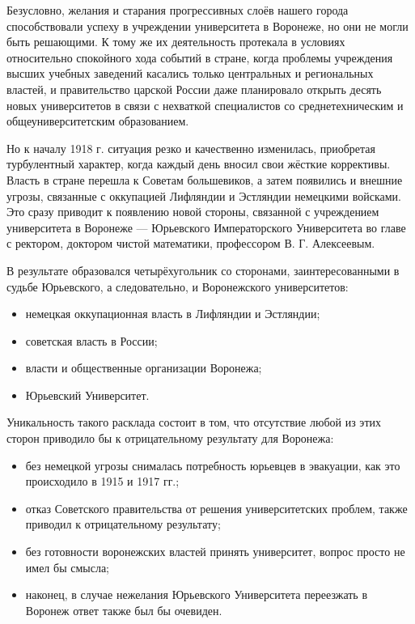Безусловно, желания и старания прогрессивных слоёв нашего города способствовали успеху в учреждении университета в Воронеже, но они не могли быть решающими. К тому же их деятельность протекала в условиях относительно спокойного хода событий в стране, когда проблемы учреждения высших учебных заведений касались только центральных и региональных властей, и правительство царской России даже планировало открыть десять новых университетов в связи с нехваткой специалистов со среднетехническим и общеуниверситетским образованием.

Но к началу 1918 г. ситуация резко и качественно изменилась, приобретая турбулентный характер, когда каждый день вносил свои жёсткие коррективы. Власть в стране перешла к Советам большевиков, а затем появились и внешние угрозы, связанные с оккупацией Лифляндии и Эстляндии немецкими войсками. Это сразу приводит к появлению новой стороны, связанной с учреждением университета в Воронеже --- Юрьевского Императорского Университета во главе с ректором, доктором чистой математики, профессором В. Г. Алексеевым.

В	результате образовался четырёхугольник со сторонами, заинтересованными в судьбе Юрьевского,
а следовате\-льно, и Воронежского университетов:

\begin{itemize}
  \item немецкая оккупационная власть в Лифляндии и Эстляндии;
  \item советская власть в России;
  \item власти и общественные организации Воронежа;
  \item Юрьевский Университет.
\end{itemize}

Уникальность такого расклада состоит в том, что отсутствие любой из этих сторон приводило бы к отрицательному результату для Воронежа:
\begin{itemize}
  \item без немецкой угрозы снималась потребность юрьевцев в эвакуации, как это происходило в 1915 и 1917 гг.;
  \item отказ Советского правительства от решения университетских проблем, также приводил к отрицательному результату;
  \item без готовности воронежских властей принять университет, вопрос просто не имел бы смысла;
  \item наконец, в случае нежелания Юрьевского Университета переезжать в Воронеж ответ также был бы очевиден.
\end{itemize}

